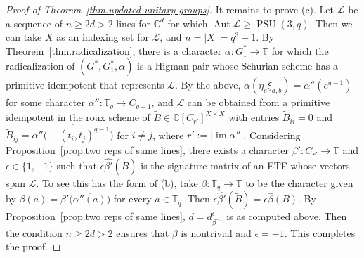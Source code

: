 \documentclass[11pt]{article}
\theoremstyle{definition}
\numberwithin{equation}{section}
\begin{document}
\begin{proof}[Proof of Theorem~\ref{thm.updated unitary groups}]
It remains to prove (c).
Let $\mathscr{L}$ be a sequence of $n \geq 2d > 2$ lines for $\mathbb{C}^d$ for which $\operatorname{Aut} \mathscr{L} \geq \operatorname{PSU}(3,q)$.
Then we can take $X$ as an indexing set for $\mathscr{L}$, and $n = |X| = q^3+1$.
By Theorem~\ref{thm.radicalization}, there is a character $\alpha \colon G_1^* \to \mathbb{T}$ for which the radicalization of $(G^*,G_1^*,\alpha)$ is a Higman pair whose Schurian scheme has a primitive idempotent that represents $\mathscr{L}$.
By the above, $\alpha(\eta_e \xi_{a,b}) = \alpha''(e^{q-1})$ for some character $\alpha'' \colon \mathbb{T}_q \to C_{q+1}$, and $\mathscr{L}$ can be obtained from a primitive idempotent in the roux scheme of $\tilde{B} \in \mathbb{C}[C_{r'}]^{X \times X}$ with entries $\tilde{B}_{ii} = 0$ and $\tilde{B}_{ij} = \overline{ \alpha''\bigl( - (t_i,t_j)^{q-1} \bigr) }$ for $i \neq j$, where $r' := | \operatorname{im} \alpha''|$.
Considering Proposition~\ref{prop.two reps of same lines}, there exists a character $\beta' \colon C_{r'} \to \mathbb{T}$ and $\epsilon \in \{1,-1\}$ such that $\epsilon\hat{\beta'}(\tilde{B})$ is the signature matrix of an ETF whose vectors span $\mathscr{L}$.
To see this has the form of (b), take $\beta \colon \mathbb{T}_q \to \mathbb{T}$ to be the character given by $\beta(a) = \beta'\bigl( \overline{ \alpha''(a) } \bigr)$ for every $a \in \mathbb{T}_q$.
Then $\epsilon \hat{\beta'}(\tilde{B}) = \epsilon \hat{\beta}(B)$.
By Proposition~\ref{prop.two reps of same lines}, $d = d_{\beta^{-1}}^\epsilon$ is as computed above.
Then the condition $n \geq 2d > 2$ ensures that $\beta$ is nontrivial and $\epsilon = -1$.
This completes the proof.
\end{proof}
\end{document}
